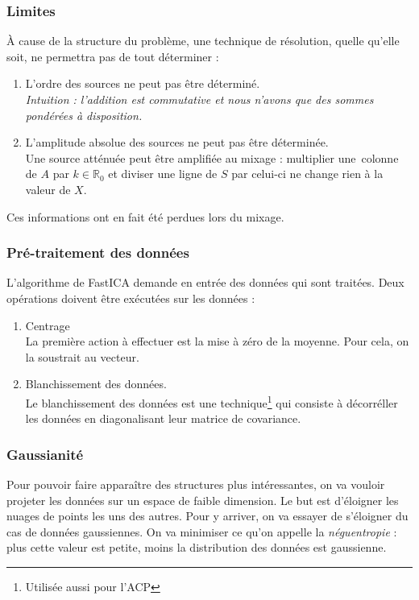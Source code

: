 \documentclass[compress]{beamer}
\newcommand{\esR}{\mathbb{R}}
\begin{document}
\begin{frame}
	\frametitle{Limites}
	À cause de la structure du problème, une technique de résolution,
	quelle qu'elle soit, ne permettra pas de tout déterminer :
	\pause
	\begin{enumerate}
	\item L'ordre des sources ne peut pas être déterminé.
	\pause
		\\\textit{Intuition : l'addition est commutative et nous n'avons que
			des sommes pondérées à disposition.}
	\pause
	\item L'amplitude absolue des sources ne peut pas être déterminée.
	\pause
		\\Une source atténuée peut être amplifiée au mixage :
			multiplier une~colonne de $A$ par $k\in\esR_0$ et
			diviser une ligne de $S$ par celui-ci ne change rien à
			la valeur de $X$.
	\pause
	\end{enumerate}

	Ces informations ont en fait été perdues lors du mixage.
\end{frame}
\begin{frame}
	\frametitle{Pré-traitement des données}
	L'algorithme de FastICA demande en entrée des données qui sont traitées.
	Deux opérations doivent être exécutées sur les données :
	\pause
	\begin{enumerate}
	\item Centrage
		\pause
			\\La première action à effectuer est la mise à zéro de la moyenne.
			Pour cela, on la soustrait au vecteur.
			\pause
	\item Blanchissement des données.
		\pause
			\\Le blanchissement des données est une
			technique\footnote{Utilisée aussi pour l'ACP}
			qui consiste à décorréller les données en diagonalisant
			leur matrice de covariance.
	
	\end{enumerate}
\end{frame}
\begin{frame}
	\frametitle{Gaussianité}
	Pour pouvoir faire apparaître des structures plus intéressantes,
	on va vouloir projeter les données sur un espace de faible dimension.
	Le but est d'éloigner les nuages de points les uns des autres.
	Pour y arriver, on va essayer de s'éloigner du cas de données gaussiennes.
	On va minimiser ce qu'on appelle la \textit{néguentropie} :
	plus cette valeur est petite, moins la distribution des données
	est gaussienne.
\end{frame}
\end{document}

